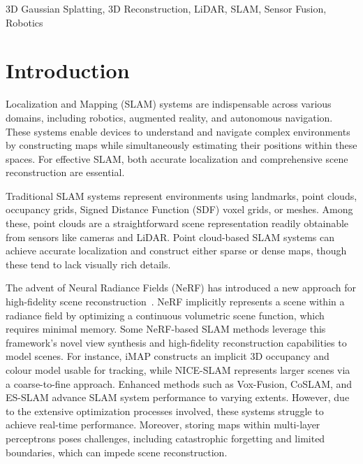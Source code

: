 \documentclass[lettersize,journal]{IEEEtran}
\begin{document}
\begin{IEEEkeywords}
3D Gaussian Splatting, 3D Reconstruction, LiDAR, SLAM, Sensor Fusion, Robotics
\end{IEEEkeywords}

\section{Introduction}
 Localization and Mapping (SLAM) systems are indispensable across various domains, including robotics, augmented reality, and autonomous navigation\cite{kazerouni2022survey}. These systems enable devices to understand and navigate complex environments by constructing maps while simultaneously estimating their positions within these spaces. For effective SLAM, both accurate localization and comprehensive scene reconstruction are essential.

Traditional SLAM systems represent environments using landmarks\cite{huang2022vwr}, point clouds\cite{li2022intensity}, occupancy grids\cite{elfes1989using}, Signed Distance Function (SDF) voxel grids\cite{reijgwart2019voxgraph}, or meshes\cite{lin2023immesh}. Among these, point clouds are a straightforward scene representation readily obtainable from sensors like cameras and LiDAR. Point cloud-based SLAM systems can achieve accurate localization and construct either sparse or dense maps, though these tend to lack visually rich details.

The advent of Neural Radiance Fields (NeRF) has introduced a new approach for high-fidelity scene reconstruction~\cite{mildenhall2021nerf}. NeRF implicitly represents a scene within a radiance field by optimizing a continuous volumetric scene function, which requires minimal memory. Some NeRF-based SLAM methods leverage this framework’s novel view synthesis and high-fidelity reconstruction capabilities to model scenes. For instance, iMAP\cite{imap} constructs an implicit 3D occupancy and colour model usable for tracking, while NICE-SLAM\cite{niceslam} represents larger scenes via a coarse-to-fine approach. Enhanced methods such as Vox-Fusion\cite{voxfusion}, CoSLAM\cite{coslam}, and ES-SLAM\cite{esslam} advance SLAM system performance to varying extents. However, due to the extensive optimization processes involved, these systems struggle to achieve real-time performance. Moreover, storing maps within multi-layer perceptrons poses challenges, including catastrophic forgetting and limited boundaries, which can impede scene reconstruction.
\end{document}
